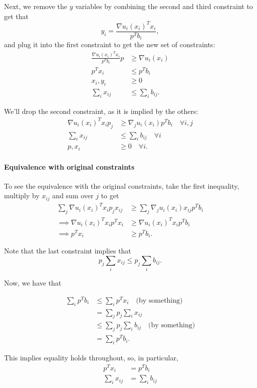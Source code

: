 \documentclass{article}
\begin{document}
Next, we remove the $y$ variables by combining the second and third constraint
to get that
\[
y_i = \frac{\nabla u_i(x_i)^T x_i}{p^T b_i},
\]
and plug it into the first constraint to get the new set of constraints:
\begin{align*}
\frac{\nabla u_i(x_i)^T x_i}{p^T b_i} p &\geq \nabla u_i(x_i) \\
p^T x_i &\leq p^T b_i\\
x_i, y_i &\geq 0\\
\sum_{i} x_{ij} &\leq \sum_{i} b_{ij}.
\end{align*}

We'll drop the second constraint, as it is implied by the others:
\begin{align*}
\nabla u_i(x_i)^T x_i p_j &\geq \nabla_j u_i(x_i) p^T b_i\quad \forall i,j \\
\sum_{i} x_{ij} &\leq \sum_{i} b_{ij}\quad \forall i\\
p, x_i &\geq 0\quad \forall i.
\end{align*}

\paragraph{Equivalence with original constraints}
To see the equivalence with the original constraints, take the first inequality,
multiply by $x_{ij}$ and sum over $j$ to get
\begin{align*}
\sum_j \nabla u_i(x_i)^T x_i p_j x_{ij} &\geq \sum_j \nabla_j u_i(x_i) x_{ij} p^T b_i \\
\implies \nabla u_i(x_i)^T x_i p^T x_i &\geq \nabla u_i(x_i)^T x_i p^T b_i \\
\implies p^T x_i &\geq p^T b_i.
\end{align*}

Note that the last constraint implies that
\[
p_j \sum_i x_{ij} \leq p_j \sum_i b_{ij}.
\]

Now, we have that

\begin{align*}
\sum_i p^T b_i &\leq \sum_i p^T x_i\quad \text{(by something)}\\
&= \sum_j p_j \sum_i x_{ij} \\
&\leq \sum_j p_j \sum_i b_{ij}\quad \text{(by something)}\\
&= \sum_i p^T b_i.
\end{align*}

This implies equality holds throughout, so, in particular,
\begin{align*}
p^T x_i &= p^T b_i\\
\sum_i x_{ij} &= \sum_i b_{ij}
\end{align*}
\end{document}
